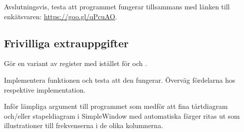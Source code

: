 \Task Avslutningsvis, testa att programmet fungerar tillsammans med länken till enkätsvaren: \url{https://goo.gl/qPcuAO}.

\subsection{Frivilliga extrauppgifter}

\Task Gör en variant av register med  istället för  och .

\Subtask Implementera funktionen och testa att den fungerar. Överväg fördelarna hos respektive implementation.
    
\Task Inför lämpliga argument till programmet som medför att fina tårtdiagram och/eller stapeldiagram i SimpleWindow med automatiska färger ritas ut som illustrationer till frekvenserna i de olika kolumnerna.
